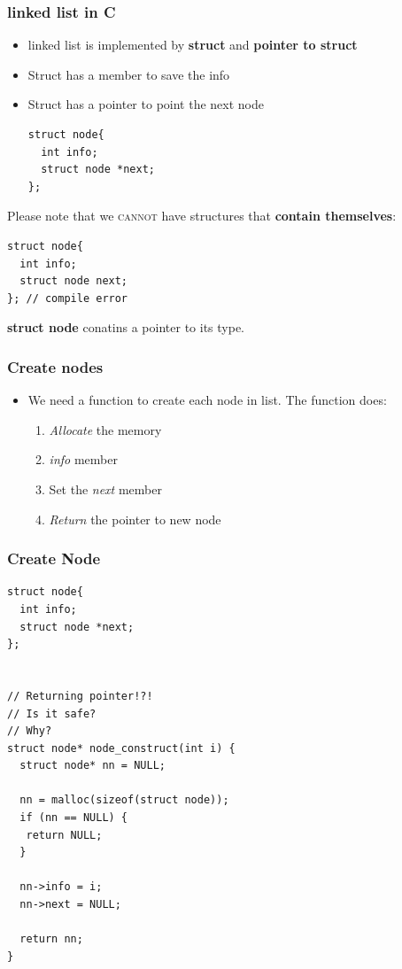 \documentclass{../c-lecture}
\begin{document}
\begin{frame}[fragile]
  \frametitle{linked list in C}
  \begin{itemize}
    \item
      linked list is implemented by
      \textbf{\color{YellowOrange} struct} and
      \textbf{\color{LimeGreen} pointer to struct}
    \item Struct has a member to save the info
    \item Struct has a pointer to point the next node
    \begin{verbatim}
struct node{
  int info;
  struct node *next;
};
    \end{verbatim}
  \end{itemize}
\end{frame}

\begin{frame}[fragile]
  \begin{block}{}
    Please note that we \textsc{\color{RubineRed} cannot} have structures that
    \textbf{\color{LimeGreen} contain themselves}:
  \end{block}
  \begin{verbatim}
struct node{
  int info;
  struct node next;
}; // compile error
  \end{verbatim}
  \begin{block}{}
    \textbf{\color{YellowOrange} struct node} conatins a pointer to its type.
  \end{block}
\end{frame}

\begin{frame}
  \frametitle{Create nodes}
  \begin{itemize}
    \item We need a function to create each node in list. The function does:
    \begin{enumerate}
      \item \textit{\color{YellowOrange} Allocate} the memory
      \item \textit{\color{LimeGreen} info} member
      \item Set the \textit{\color{Cyan} next} member
      \item \textit{\color{Violet} Return} the pointer to new node
    \end{enumerate}
  \end{itemize}
\end{frame}

\begin{frame}[fragile]
  \frametitle{Create Node}
  \begin{verbatim}
struct node{
  int info;
  struct node *next;
};


// Returning pointer!?!
// Is it safe?
// Why?
struct node* node_construct(int i) {
  struct node* nn = NULL;

  nn = malloc(sizeof(struct node));
  if (nn == NULL) {
   return NULL;
  }

  nn->info = i;
  nn->next = NULL;

  return nn;
}
  \end{verbatim}
\end{frame}
\end{document}
